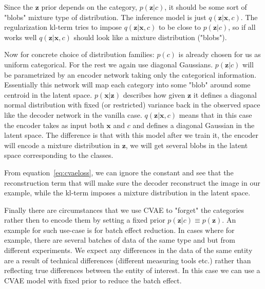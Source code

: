 \documentclass[11pt, a4paper]{report}
\theoremstyle{plain}
\theoremstyle{definition}
\theoremstyle{remark}
\newcommand{\x}{\mathbf{x}}
\newcommand{\z}{\mathbf{z}}
\begin{document}
Since the $\z$ prior depends on the category, $p(\z | c)$, it should be some
sort of "blobs" mixture type of distribution.
The inference model is just $q(\z | \x,c)$. The regularization kl-term tries
to impose $q(\z | \x, c)$ to be close to $p(\z | c)$, so if all works well 
$q(\z | \x, c)$ should look like a mixture distribution ("blobs").

Now for concrete choice of distribution families:
$p(c)$ is already chosen for us as uniform categorical. 
For the rest we again use diagonal Gaussians.
$p(\z | c)$ will be parametrized by an encoder network taking only the
categorical information. Essentially this network will map each category into
some "blob" around some centroid in the latent space. 
$p(\x | \z)$ describes how given $\z$ it defines a diagonal normal distribution
with fixed (or restricted) variance back in the
observed space like the decoder network in the vanilla case.
$q(\z | \x, c)$ means that in this case the encoder takes as input both $\x$ and
$c$ and defines a diagonal Gaussian in the latent space.
The difference is that with this model after we train it, the encoder will
encode a mixture distribution in $\z$, we will get several blobs in the latent
space corresponding to the classes.

From equation~\ref{eq:cvaeloss}, we can ignore the constant and see that the
reconstruction term that will make sure the decoder reconstruct the image in
our example, while the kl-term imposes a mixture distribution in the latent
space.

Finally there are circumstances that we use CVAE to "forget" the categories
rather then to encode them by setting a fixed prior $p(\z | c) \equiv p(\z)$.
An example for such use-case is for batch effect reduction.
In cases where for example, there are several batches of data
of the same type and but from different experiments.
We expect any differences in the data of the same entity are a result of technical differences 
(different measuring tools etc.) rather than reflecting true differences between
the entity of interest.
In this case we can use
a CVAE model with fixed prior to reduce the batch effect.
\end{document}
